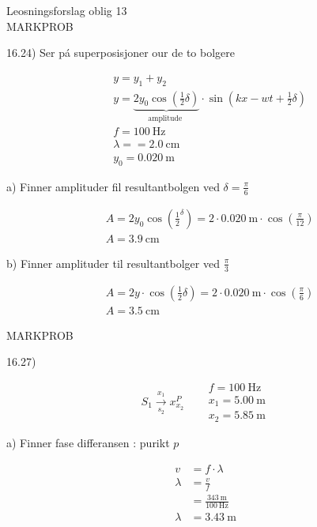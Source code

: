 \documentclass[10pt]{article}
\begin{document}
Leosningsforslag oblig 13\\

MARKPROB

16.24) Ser pá superposisjoner our de to bolgere

$$
\begin{aligned}
& y=y_{1}+y_{2} \\
& y=\underbrace{2 y_{0} \cos \left(\frac{1}{2} \delta\right)}_{\text {amplitude }} \cdot \sin \left(k x-w t+\frac{1}{2} \delta\right) \\
& f=100 \mathrm{~Hz} \\
& \lambda==2.0 \mathrm{~cm} \\
& y_{0}=0.020 \mathrm{~m}
\end{aligned}
$$

a) Finner amplituder fil resultantbolgen ved $\delta=\frac{\pi}{6}$

$$
\begin{aligned}
& A=2 y_{0} \cos \left(\frac{1}{2}^{\delta}\right)=2 \cdot 0.020 \mathrm{~m} \cdot \cos \left(\frac{\pi}{12}\right) \\
& A=3.9 \mathrm{~cm}
\end{aligned}
$$

b) Finner amplituder til resultantbolger ved $\frac{\pi}{3}$

$$
\begin{aligned}
& A=2 y \cdot \cos \left(\frac{1}{2} \delta\right)=2 \cdot 0.020 \mathrm{~m} \cdot \cos \left(\frac{\pi}{6}\right) \\
& A=3.5 \mathrm{~cm}
\end{aligned}
$$

MARKPROB

16.27)

$$
S_{1} \xrightarrow[s_{2}]{x_{1}} x_{x_{2}}^{P} \quad \begin{aligned}
& f=100 \mathrm{~Hz} \\
& x_{1}=5.00 \mathrm{~m} \\
& x_{2}=5.85 \mathrm{~m}
\end{aligned}
$$

a) Finner fase differansen : purikt $p$

$$
\begin{aligned}
v & =f \cdot \lambda \\
\lambda & =\frac{v}{f} \\
& =\frac{343 \mathrm{~m}}{100 \mathrm{~Hz}} \\
\lambda & =3.43 \mathrm{~m}
\end{aligned}
$$
\end{document}
